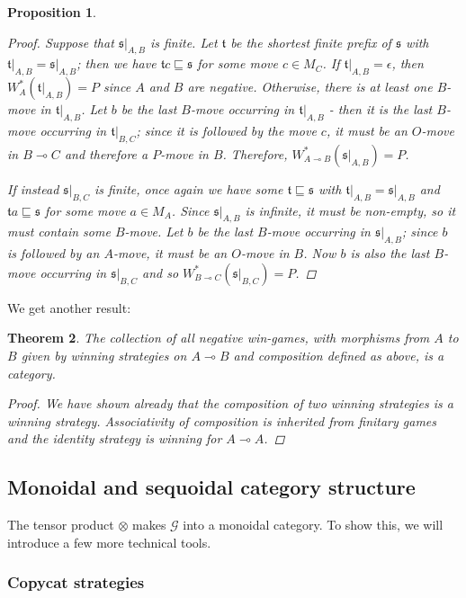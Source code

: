 \documentclass[11pt]{article} %
\theoremstyle{plain} %
\newtheorem{theorem}{Theorem}[section]
\newtheorem{proposition}[theorem]{Proposition}
\theoremstyle{definition} %
\theoremstyle{note}
\theoremstyle{exercisestyle}
\newcommand{\tensor}{\otimes}
\renewcommand{\implies}{\multimap}
\newcommand{\G}{\mathcal G}
\newcommand{\s}{\mathfrak s}
\renewcommand{\t}{\mathfrak t}
\newcommand{\emptyplay}{\epsilon}
\newcommand{\prefix}{\sqsubseteq}
\begin{document}
\begin{proposition}
\begin{proof}
    Suppose that $\s\vert_{A,B}$ is finite.  Let $\t$ be the shortest finite prefix of $\s$ with $\t\vert_{A,B}=\s\vert_{A,B}$; then we have $\t c\prefix \s$ for some move $c\in M_C$.  If $\t\vert_{A,B}=\emptyplay$, then $W_A^*(\t\vert_{A,B})=P$ since $A$ and $B$ are negative.  Otherwise, there is at least one $B$-move in $\t\vert_{A,B}$.  Let $b$ be the last $B$-move occurring in $\t\vert_{A,B}$ - then it is the last $B$-move occurring in $\t\vert_{B,C}$; since it is followed by the move $c$, it must be an $O$-move in $B\implies C$ and therefore a $P$-move in $B$.  Therefore, $W_{A\implies B}^*(\s\vert_{A,B})=P$.  

    If instead $\s\vert_{B,C}$ is finite, once again we have some $\t\prefix\s$ with $\t\vert_{A,B}=\s\vert_{A,B}$ and $\t a\prefix\s$ for some move $a\in M_A$.  Since $\s\vert_{A,B}$ is infinite, it must be non-empty, so it must contain some $B$-move.  Let $b$ be the last $B$-move occurring in $\s\vert_{A,B}$; since $b$ is followed by an $A$-move, it must be an $O$-move in $B$.  Now $b$ is also the last $B$-move occurring in $\s\vert_{B,C}$ and so $W_{B\implies C}^*(\s\vert_{B,C})=P$.
  \end{proof}
\end{proposition}

We get another result:

\begin{theorem}
  The collection of all negative win-games, with morphisms from $A$ to $B$ given by winning strategies on $A\implies B$ and composition defined as above, is a category.
  \begin{proof}
    We have shown already that the composition of two winning strategies is a winning strategy.  Associativity of composition is inherited from finitary games and the identity strategy is winning for $A\implies A$.  
  \end{proof}
\end{theorem}

\subsection{Monoidal and sequoidal category structure}

The tensor product $\tensor$ makes $\G$ into a monoidal category.  To show this, we will introduce a few more technical tools.

\subsubsection{Copycat strategies}
\end{document}
